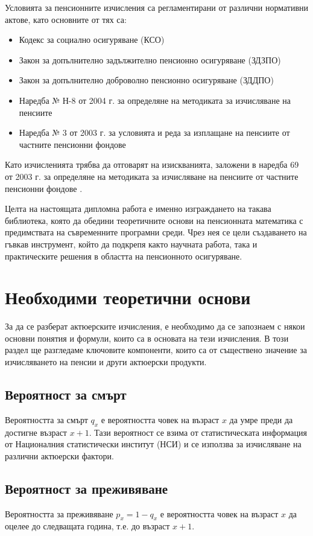\documentclass[a4paper,12pt]{article}
\begin{document}
Условията за пенсионните изчисления са регламентирани от различни нормативни актове, като основните от тях са:
\begin{itemize}
        \item Кодекс за социално осигуряване (КСО)
        \item Закон за допълнително задължително пенсионно осигуряване (ЗДЗПО)
        \item Закон за допълнително доброволно пенсионно осигуряване (ЗДДПО)
        \item Наредба № Н-8 от 2004 г. за определяне на методиката за изчисляване на пенсиите
        \item Наредба № 3 от 2003 г. за условията и реда за изплащане на пенсиите от частните пенсионни фондове
\end{itemize}
Като изчисленията трябва да отговарят на изискванията, заложени в наредба 69 от 2003 г. за определяне на методиката за изчисляване на пенсиите от частните пенсионни фондове \cite{ZDZPO_2004,ZDOO_2000,DKFN_Pensions,NOI_Official}.

Целта на настоящата дипломна работа е именно изграждането на такава библиотека, която да обедини теоретичните основи на пенсионната математика с предимствата на съвременните програмни среди. Чрез нея се цели създаването на гъвкав инструмент, който да подкрепя както научната работа, така и практическите решения в областта на пенсионното осигуряване.
\newpage
\section{Необходими теоретични основи}
За да се разберат актюерските изчисления, е необходимо да се запознаем с някои основни понятия и формули, които са в основата на тези изчисления. В този раздел ще разгледаме ключовите компоненти, които са от съществено значение за изчисляването на пенсии и други актюерски продукти.
\subsection{Вероятност за смърт}
Вероятността за смърт $q_x$ е вероятността човек на възраст $x$ да умре преди да достигне възраст $x+1$. Тази вероятност се взима от статистическата информация от Националния статистически институт (НСИ) и се използва за изчисляване на различни актюерски фактори.
\subsection{Вероятност за преживяване}
Вероятността за преживяване $p_x= 1-q_x$ е вероятността човек на възраст $x$ да оцелее до следващата година, т.е. до възраст $x+1$.
\end{document}

